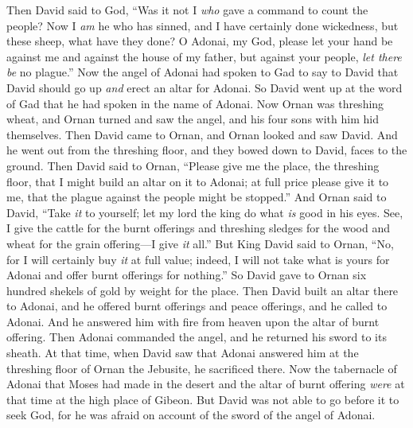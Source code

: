 \begin{biblechapter}
\verse Then David said to God, “Was it not I \textit{who} gave a command to count the people? Now I \textit{am} he who has sinned, and I have certainly done wickedness, but these sheep, what have they done? O Adonai, my God, please let your hand be against me and against the house of my father, but against your people, \textit{let there be} no plague.”
 Now the angel of Adonai had spoken to Gad to say to David that David should go up \textit{and} erect an altar for Adonai.
\verse So David went up at the word of Gad that he had spoken in the name of Adonai.
\verse Now Ornan was threshing wheat, and Ornan turned and saw the angel, and his four sons with him hid themselves.
\verse Then David came to Ornan, and Ornan looked and saw David. And he went out from the threshing floor, and they bowed down to David, faces to the ground.
\verse Then David said to Ornan, “Please give me the place, the threshing floor, that I might build an altar on it to Adonai; at full price please give it to me, that the plague against the people might be stopped.”
\verse And Ornan said to David, “Take \textit{it} to yourself; let my lord the king do what \textit{is} good in his eyes. See, I give the cattle for the burnt offerings and threshing sledges for the wood and wheat for the grain offering—I give \textit{it} all.”
\verse But King David said to Ornan, “No, for I will certainly buy \textit{it} at full value; indeed, I will not take what is yours for Adonai and offer burnt offerings for nothing.”
\verse So David gave to Ornan six hundred shekels of gold by weight for the place.
\verse Then David built an altar there to Adonai, and he offered burnt offerings and peace offerings, and he called to Adonai. And he answered him with fire from heaven upon the altar of burnt offering.
\verse Then Adonai commanded the angel, and he returned his sword to its sheath.
\verse At that time, when David saw that Adonai answered him at the threshing floor of Ornan the Jebusite, he sacrificed there.
\verse Now the tabernacle of Adonai that Moses had made in the desert and the altar of burnt offering \textit{were} at that time at the high place of Gibeon.
\verse But David was not able to go before it to seek God, for he was afraid on account of the sword of the angel of Adonai.
\end{biblechapter}

